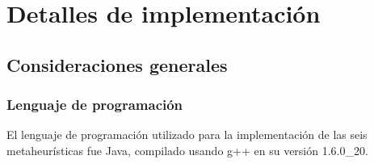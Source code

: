 \chapter{Detalles de implementación} \label{chap:implementacion}

\section{Consideraciones generales} \label{sect:implementacion-consideraciones}

\subsection{Lenguaje de programación} \label{sect:implementacion-lenguaje}

El lenguaje de programación utilizado para la implementación de las seis metaheurísticas fue Java, compilado usando g++ en su versión 
1.6.0\_20.